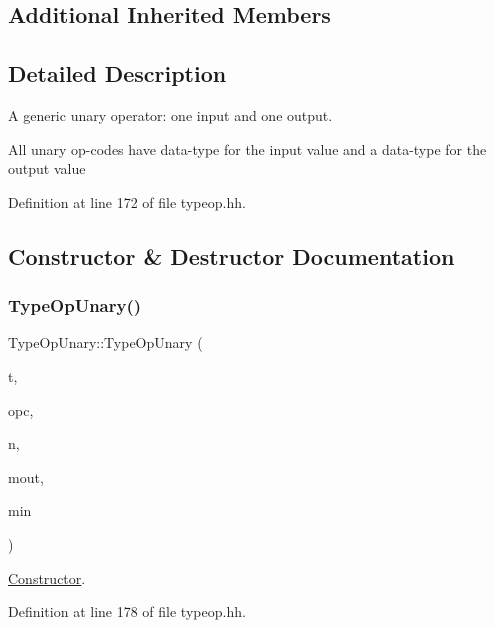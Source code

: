 \subsection*{Additional Inherited Members}


\subsection{Detailed Description}
A generic unary operator\+: one input and one output. 

All unary op-\/codes have data-\/type for the input value and a data-\/type for the output value 

Definition at line 172 of file typeop.\+hh.



\subsection{Constructor \& Destructor Documentation}
\mbox{\label{class_type_op_unary_ab24fc74e370f34dd61f488825fca2dc7}} 
\subsubsection{\texorpdfstring{TypeOpUnary()}{TypeOpUnary()}}
{\footnotesize\ttfamily Type\+Op\+Unary\+::\+Type\+Op\+Unary (\begin{DoxyParamCaption}\item[{\mbox{\hyperlink{class_type_factory}{Type\+Factory}} $\ast$}]{t,  }\item[{\mbox{\hyperlink{opcodes_8hh_abeb7dfb0e9e2b3114e240a405d046ea7}{Op\+Code}}}]{opc,  }\item[{const string \&}]{n,  }\item[{\mbox{\hyperlink{type_8hh_aef6429f2523cdf4d415ba04a0209e61f}{type\+\_\+metatype}}}]{mout,  }\item[{\mbox{\hyperlink{type_8hh_aef6429f2523cdf4d415ba04a0209e61f}{type\+\_\+metatype}}}]{min }\end{DoxyParamCaption})\hspace{0.3cm}{\ttfamily [inline]}}



\mbox{\hyperlink{class_constructor}{Constructor}}. 



Definition at line 178 of file typeop.\+hh.



